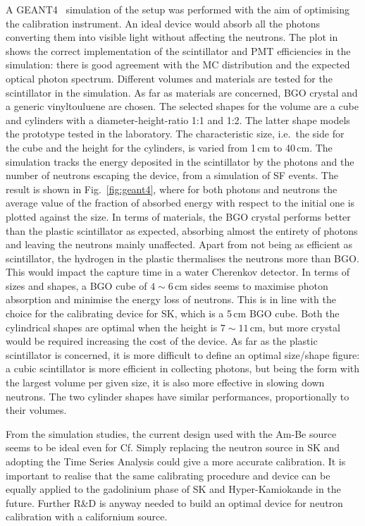 A GEANT4~\cite{Agostinelli:2002hh} simulation of the setup was performed with the aim of optimising the calibration instrument.
An ideal device would absorb all the photons converting them into visible light without affecting the neutrons.
The plot in  shows the correct implementation of the scintillator and PMT efficiencies in the simulation: %
there is good agreement with the MC distribution and the expected optical photon spectrum.
Different volumes and materials are tested for the scintillator in the simulation.
As far as materials are concerned, BGO crystal and a generic vinyltouluene are chosen.
The selected shapes for the volume are a cube and cylinders with a diameter-height-ratio 1:1 and 1:2.
The latter shape models the prototype tested in the laboratory.
The characteristic size, i.e.\ the side for the cube and the height for the cylinders, is varied from 1\,cm to 40\,cm.
The simulation tracks the energy deposited in the scintillator by the photons and the number of neutrons escaping the device, %
from a simulation of  SF events.
The result is shown in Fig.~\ref{fig:geant4}, where for both photons and neutrons %
the average value of the fraction of absorbed energy with respect to the initial one is plotted against the size.
In terms of materials, the BGO crystal performs better than the plastic scintillator as expected, %
absorbing almost the entirety of photons and leaving the neutrons mainly unaffected.
Apart from not being as efficient as scintillator, the hydrogen in the plastic thermalises the neutrons more than BGO.
This would impact the capture time in a water Cherenkov detector.
In terms of sizes and shapes, a BGO cube of $4\sim6$\,cm sides seems to maximise photon absorption and minimise %
the energy loss of neutrons.
This is in line with the choice for the calibrating device for SK, which is a 5\,cm BGO cube.
Both the cylindrical shapes are optimal when the height is $7\sim11$\,cm, but more crystal would be required %
increasing the cost of the device.
As far as the plastic scintillator is concerned, it is more difficult to define an optimal size/shape figure:
a cubic scintillator is more efficient in collecting photons, but being the form with the largest volume %
per given size, it is also more effective in slowing down neutrons.
The two cylinder shapes have similar performances, proportionally to their volumes.

From the simulation studies, the current design used with the Am-Be source seems to be ideal %
even for Cf.
Simply replacing the neutron source in SK and adopting the Time Series Analysis could give a more accurate calibration.
It is important to realise that the same calibrating procedure and device can be equally applied %
to the gadolinium phase of SK and Hyper-Kamiokande in the future.
Further R\&D is anyway needed to build an optimal device for neutron calibration with a californium source.

